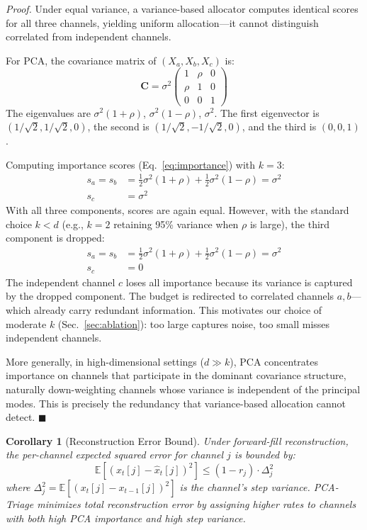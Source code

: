 \documentclass[journal]{IEEEtran}
\newtheorem{corollary}{Corollary}
\renewenvironment{proof}[1][Proof]{\noindent\textit{#1.}\space}{\hfill$\blacksquare$\par\medskip}
\begin{document}
\begin{proof}
Under equal variance, a variance-based allocator computes identical scores for all three channels, yielding uniform allocation---it cannot distinguish correlated from independent channels.

For PCA, the covariance matrix of $(X_a, X_b, X_c)$ is:
\begin{equation}
\mathbf{C} = \sigma^2 \begin{pmatrix} 1 & \rho & 0 \\ \rho & 1 & 0 \\ 0 & 0 & 1 \end{pmatrix}
\end{equation}
The eigenvalues are $\sigma^2(1+\rho)$, $\sigma^2(1-\rho)$, $\sigma^2$. The first eigenvector is $(1/\sqrt{2}, 1/\sqrt{2}, 0)$, the second is $(1/\sqrt{2}, -1/\sqrt{2}, 0)$, and the third is $(0, 0, 1)$.

Computing importance scores (Eq.~\ref{eq:importance}) with $k=3$:
\begin{align}
s_a = s_b &= \tfrac{1}{2}\sigma^2(1+\rho) + \tfrac{1}{2}\sigma^2(1-\rho) = \sigma^2 \\
s_c &= \sigma^2
\end{align}
With all three components, scores are again equal. However, with the standard choice $k < d$ (e.g., $k=2$ retaining 95\% variance when $\rho$ is large), the third component is dropped:
\begin{align}
s_a = s_b &= \tfrac{1}{2}\sigma^2(1+\rho) + \tfrac{1}{2}\sigma^2(1-\rho) = \sigma^2 \\
s_c &= 0
\end{align}
The independent channel $c$ loses all importance because its variance is captured by the dropped component. The budget is redirected to correlated channels $a, b$---which already carry redundant information. This motivates our choice of moderate $k$ (Sec.~\ref{sec:ablation}): too large captures noise, too small misses independent channels.

More generally, in high-dimensional settings ($d \gg k$), PCA concentrates importance on channels that participate in the dominant covariance structure, naturally down-weighting channels whose variance is independent of the principal modes. This is precisely the redundancy that variance-based allocation cannot detect.
\end{proof}

\begin{corollary}[Reconstruction Error Bound]
\label{cor:recon}
Under forward-fill reconstruction, the per-channel expected squared error for channel $j$ is bounded by:
\begin{equation}
\mathbb{E}[(x_t[j] - \hat{x}_t[j])^2] \leq (1 - r_j) \cdot \Delta_j^2
\end{equation}
where $\Delta_j^2 = \mathbb{E}[(x_t[j] - x_{t-1}[j])^2]$ is the channel's step variance. PCA-Triage minimizes total reconstruction error by assigning higher rates to channels with both high PCA importance \textit{and} high step variance.
\end{corollary}
\end{document}
